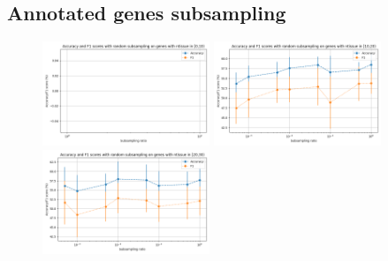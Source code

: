 \subsection{Annotated genes subsampling}
\begin{figure}[h]
\includegraphics[width=5cm]{figures/subsample_ntissue_0.png}
\includegraphics[width=5cm]{figures/subsample_ntissue_10.png}
\includegraphics[width=5cm]{figures/subsample_ntissue_20.png}
\end{figure}

